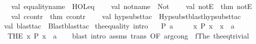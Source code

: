 \begin{isabellebody}
\ \ \ \ val\ equality{\isacharunderscore}{\kern0pt}name\ {\isacharequal}{\kern0pt}\ \isactrlconstUNDERSCOREname {\isasymopen}HOL{\isachardot}{\kern0pt}eq{\isasymclose}\isanewline
\ \ \ \ val\ not{\isacharunderscore}{\kern0pt}name\ {\isacharequal}{\kern0pt}\ \isactrlconstUNDERSCOREname {\isasymopen}Not{\isasymclose}\isanewline
\ \ \ \ val\ notE\ {\isacharequal}{\kern0pt}\ {\isacharat}{\kern0pt}{\isacharbraceleft}{\kern0pt}thm\ notE{\isacharbraceright}{\kern0pt}\isanewline
\ \ \ \ val\ ccontr\ {\isacharequal}{\kern0pt}\ {\isacharat}{\kern0pt}{\isacharbraceleft}{\kern0pt}thm\ ccontr{\isacharbraceright}{\kern0pt}\isanewline
\ \ \ \ val\ hyp{\isacharunderscore}{\kern0pt}subst{\isacharunderscore}{\kern0pt}tac\ {\isacharequal}{\kern0pt}\ Hypsubst{\isachardot}{\kern0pt}blast{\isacharunderscore}{\kern0pt}hyp{\isacharunderscore}{\kern0pt}subst{\isacharunderscore}{\kern0pt}tac\isanewline
\ \ {\isacharparenright}{\kern0pt}{\isacharsemicolon}{\kern0pt}\isanewline
\ \ val\ blast{\isacharunderscore}{\kern0pt}tac\ {\isacharequal}{\kern0pt}\ Blast{\isachardot}{\kern0pt}blast{\isacharunderscore}{\kern0pt}tac{\isacharsemicolon}{\kern0pt}\isanewline
{\isacartoucheclose}%
\endisatagML
{\isafoldML}%
%
\isadelimML
%
\endisadelimML
%
\isadelimdocument
%
\endisadelimdocument
%
\isatagdocument
%
\isamarkuptrue%
%
\endisatagdocument
{\isafolddocument}%
%
\isadelimdocument
%
\endisadelimdocument
{}\isamarkupfalse%
\ the{\isacharunderscore}{\kern0pt}equality\ {\isacharbrackleft}{\kern0pt}intro{\isacharbrackright}{\kern0pt}{\isacharcolon}{\kern0pt}\isanewline
\ \ \ {\isachardoublequoteopen}P\ a{\isachardoublequoteclose}\isanewline
\ \ \ \ \ {\isachardoublequoteopen}{\isasymAnd}x{\isachardot}{\kern0pt}\ P\ x\ {\isasymLongrightarrow}\ x\ {\isacharequal}{\kern0pt}\ a{\isachardoublequoteclose}\isanewline
\ \ \ {\isachardoublequoteopen}{\isacharparenleft}{\kern0pt}THE\ x{\isachardot}{\kern0pt}\ P\ x{\isacharparenright}{\kern0pt}\ {\isacharequal}{\kern0pt}\ a{\isachardoublequoteclose}\isanewline
%
\isadelimproof
\ \ %
\endisadelimproof
%
\isatagproof
{}\isamarkupfalse%
\ {\isacharparenleft}{\kern0pt}blast\ intro{\isacharcolon}{\kern0pt}\ assms\ trans\ {\isacharbrackleft}{\kern0pt}OF\ arg{\isacharunderscore}{\kern0pt}cong\ {\isacharbrackleft}{\kern0pt}\ f{\isacharequal}{\kern0pt}The{\isacharbrackright}{\kern0pt}\ the{\isacharunderscore}{\kern0pt}eq{\isacharunderscore}{\kern0pt}trivial{\isacharbrackright}{\kern0pt}{\isacharparenright}{\kern0pt}%

\end{isabellebody}
